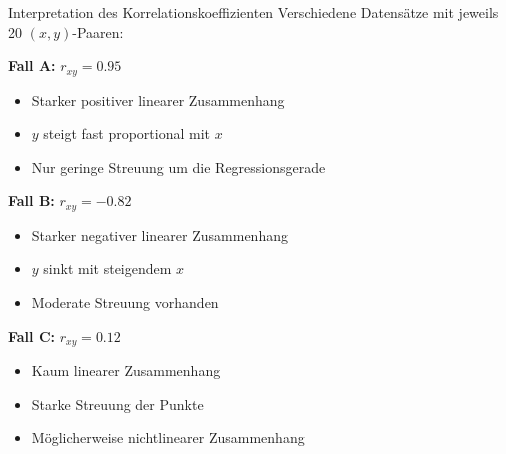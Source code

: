 \begin{example2}{Interpretation des Korrelationskoeffizienten}
Verschiedene Datensätze mit jeweils 20 $(x,y)$-Paaren:

\textbf{Fall A:} $r_{xy} = 0.95$
\begin{itemize}
    \item Starker positiver linearer Zusammenhang
    \item $y$ steigt fast proportional mit $x$
    \item Nur geringe Streuung um die Regressionsgerade
\end{itemize}

\textbf{Fall B:} $r_{xy} = -0.82$
\begin{itemize}
    \item Starker negativer linearer Zusammenhang
    \item $y$ sinkt mit steigendem $x$
    \item Moderate Streuung vorhanden
\end{itemize}

\textbf{Fall C:} $r_{xy} = 0.12$
\begin{itemize}
    \item Kaum linearer Zusammenhang
    \item Starke Streuung der Punkte
    \item Möglicherweise nichtlinearer Zusammenhang
\end{itemize}
\end{example2}

